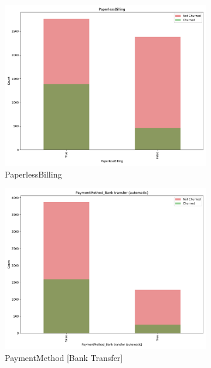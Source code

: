 \documentclass[a4paper,11pt]{article}
\begin{document}
\begin{landscape}
\begin{figure}
\begin{subfigure}{0.14\linewidth}
    \includegraphics[width=\linewidth]{figures/understanding/PaperlessBilling.pdf}
    \caption{PaperlessBilling}
\end{subfigure}
\begin{subfigure}{0.14\linewidth}
    \includegraphics[width=\linewidth]{figures/understanding/PaymentMethod_Bank transfer (automatic).pdf}
    \caption{PaymentMethod [Bank Transfer]}
\end{subfigure}
\begin{subfigure}{0.14\linewidth}

\end{subfigure}
\end{figure}
\end{landscape}
\end{document}
